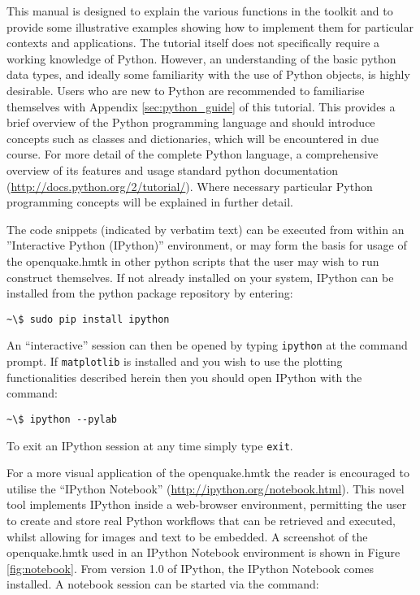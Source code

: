 This manual is designed to explain the various functions in the toolkit and to provide some illustrative examples showing how to implement them for particular contexts and applications. The tutorial itself does not specifically require a working knowledge of Python. However, an understanding of the basic python data types, and ideally some familiarity with the use of Python objects, is highly desirable. Users who are new to Python are recommended to familiarise themselves with Appendix \ref{sec:python_guide} of this tutorial. This provides a brief overview of the Python programming language and should introduce concepts such as classes and dictionaries, which will be encountered in due course. For more detail of the complete Python language, a comprehensive overview of its features and usage standard python documentation (\href{http://docs.python.org/2/tutorial/}{http://docs.python.org/2/tutorial/}). Where necessary particular Python programming concepts will be explained in further detail.

The code snippets (indicated by verbatim text) can be executed from within an ''Interactive Python (IPython)'' environment, or may form the basis for usage of the openquake.hmtk in other python scripts that the user may wish to run construct themselves. If not already installed on your system, IPython can be installed from the python package repository by entering: 

\begin{Verbatim}[frame=single, commandchars=\\\{\}, fontsize=\scriptsize]
~\$ sudo pip install ipython
\end{Verbatim}

An ``interactive'' session can then be opened by typing \verb=ipython= at the command prompt. If \verb=matplotlib= is installed and you wish to use the plotting functionalities described herein then you should open IPython with the command:

\begin{Verbatim}[frame=single, commandchars=\\\{\}, fontsize=\scriptsize]
~\$ ipython --pylab
\end{Verbatim}

To exit an IPython session at any time simply type \verb=exit=.

For a more visual application of the openquake.hmtk the reader is encouraged to utilise the ``IPython Notebook'' (\href{http://ipython.org/notebook.html}{http://ipython.org/notebook.html}). This novel tool implements IPython inside a web-browser environment, permitting the user to create and store real Python workflows that can be retrieved and executed, whilst allowing for images and text to be embedded. A screenshot of the openquake.hmtk used in an IPython Notebook environment is shown in Figure \ref{fig:notebook}. From version 1.0 of IPython, the IPython Notebook comes installed. A notebook session can be
started via the command:

